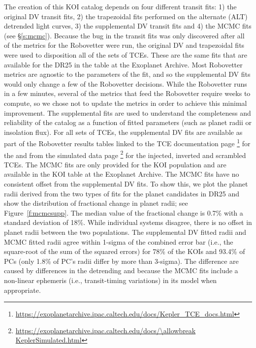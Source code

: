 The creation of this KOI catalog depends on four different transit fits: 1) the original DV transit fits, 2) the trapezoidal fits performed on the alternate (ALT) \citet{Garcia2010} detrended light curves, 3) the supplemental DV transit fits and 4) the MCMC fits (see \S\ref{s:mcmc}).  Because the bug in the transit fits was only discovered after all of the metrics for the Robovetter were run, the original DV and trapezoidal fits were used to disposition all of the sets of TCEs. These are the same fits that are available for the DR25  in the table at the Exoplanet Archive. Most Robovetter metrics are agnostic to the parameters of the fit, and so the supplemental DV fits would only change a few of the Robovetter decisions. While the Robovetter runs in a few minutes, several of the metrics that feed the Robovetter require weeks to compute, so we chose not to update the metrics in order to achieve this minimal improvement. The supplemental fits are used to understand the completeness and reliability of the catalog as a function of fitted parameters (such as planet radii or insolation flux).  For all sets of TCEs, the supplemental DV fits are available as part of the Robovetter results tables linked to the TCE documentation page \footnote{\url{https://exoplanetarchive.ipac.caltech.edu/docs/Kepler\_TCE\_docs.html}} for the  and from the simulated data page \footnote{\url{https://exoplanetarchive.ipac.caltech.edu/docs/\allowbreak KeplerSimulated.html}}  \citep[see][]{Christiansen2017,Coughlin2017a} for the injected, inverted and scrambled TCEs. The MCMC fits are only provided for the KOI population and are available in the KOI table at the Exoplanet Archive. The MCMC fits have no consistent offset from the supplemental DV fits.  To show this, we plot the planet radii derived from the two types of fits for the planet candidates in DR25 and show the distribution of fractional change in planet radii; see Figure~\ref{f:mcmcsupp}. The median value of the fractional change is 0.7\% with a standard deviation of 18\%. While individual systems disagree, there is no offset in planet radii between the two populations. The supplemental DV fitted radii and MCMC fitted radii agree within 1-sigma of the combined error bar (i.e., the square-root of the sum of the squared errors) for 78\% of the KOIs and 93.4\% of PCs (only 1.8\% of PC's radii differ by more than 3-sigma).  The difference are caused by differences in the detrending and because the MCMC fits include a non-linear ephemeris (i.e., transit-timing variations) in its model when appropriate.

